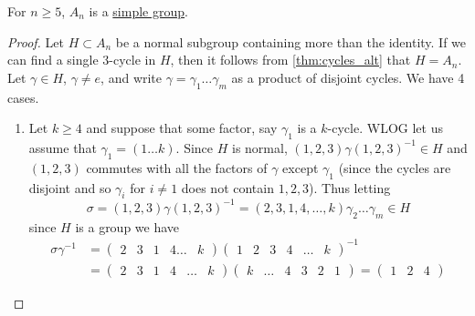   \begin{theorem}
    \label{thm:alternating-groups-are-simple}
    For $n \geq 5$, $A_n$ is a \hyperref[def:simple-group]{simple group}. 
  \end{theorem}
  \begin{proof}
    Let $H \subset A_n$ be a normal subgroup containing more than the identity. If we can find a single 3-cycle in $H$, then it follows from \ref{thm:cycles_alt} that $H = A_n$. Let $\gamma \in H$, $\gamma \neq e$, and write $\gamma = \gamma_1 \ldots \gamma_m$ as a product of disjoint cycles. We have 4 cases. 
    \begin{enumerate}
      \item Let $k \geq 4$ and suppose that some factor, say $\gamma_1$ is a $k$-cycle. WLOG let us assume that $\gamma_1 = (1 \ldots k)$. Since $H$ is normal, $(1, 2, 3) \gamma (1, 2, 3)^{-1} \in H$ and $(1, 2, 3)$ commutes with all the factors of $\gamma$ except $\gamma_1$ (since the cycles are disjoint and so $\gamma_i$ for $i \neq 1$ does not contain $1, 2, 3$). Thus letting 
      \begin{equation}
        \sigma = (1, 2, 3) \gamma (1, 2, 3)^{-1} = (2, 3, 1, 4, \ldots, k) \gamma_2 \ldots \gamma_m \in H
      \end{equation} 
      since $H$ is a group we have 
      \begin{align}
        \sigma \gamma^{-1} & = \begin{pmatrix} 2 & 3 & 1 & 4 \ldots & k \end{pmatrix} \begin{pmatrix} 1 & 2 & 3 & 4 & \ldots & k \end{pmatrix}^{-1} \\
                           & = \begin{pmatrix} 2 & 3 & 1 & 4 & \ldots & k \end{pmatrix} \begin{pmatrix} k & \ldots & 4 & 3 & 2 & 1 \end{pmatrix} = \begin{pmatrix} 1 & 2 & 4 \end{pmatrix}
      \end{align}


\end{enumerate}
\end{proof}
